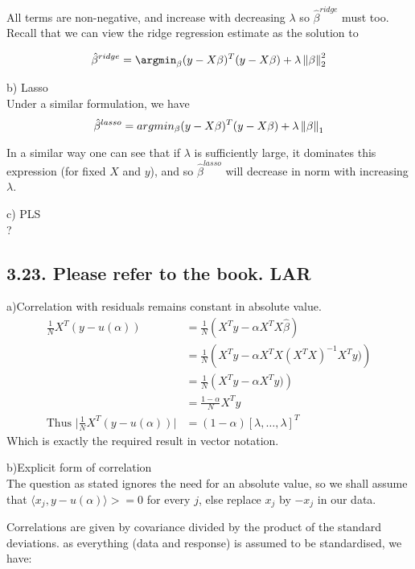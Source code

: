 All terms are non-negative, and increase with decreasing $\lambda$ so $\hat{\beta}^{ridge}$ must too.
Recall that we can view the ridge regression estimate as the solution to

$$\hat{\beta}^{ridge} = \argmin_\beta (y - X\beta)^T (y - X \beta) + \lambda \norm{\beta}_2^2$$

b) Lasso\\

Under a similar formulation, we have 
$$\hat{\beta}^{lasso} = argmin_\beta (y - X\beta)^T (y - X \beta) + \lambda \left\lVert\beta\right\rVert_1$$

In a similar way one can see that if $\lambda$ is sufficiently large, it dominates this expression (for fixed $X$ and $y$), and so $\hat{\beta}^{lasso}$ will decrease in norm with increasing $\lambda$.

c) PLS\\

?

\subsection*{3.23. Please refer to the book. LAR}
a)Correlation with residuals remains constant in absolute value.\\

\begin{align*}
    \frac{1}{N} X^T \left(y - u(\alpha)\right) &= \frac{1}{N}\left(X^T y - \alpha X^T X\hat{\beta}\right)\\
    &= \frac{1}{N}\left(X^T y - \alpha X^T X \left(X^T X\right)^{-1} X^T y)\right)\\
    &= \frac{1}{N}\left(X^T y - \alpha X^T y)\right)\\
    &= \frac{1-\alpha}{N}X^T y\\
    \text{Thus }\lvert\frac{1}{N} X^T \left(y - u(\alpha)\right) \rvert &= (1-\alpha) [\lambda,\dots,\lambda]^T
\end{align*}
Which is exactly the required result in vector notation.

b)Explicit form of correlation\\

The question as stated ignores the need for an absolute value, so we shall assume that $\langle x_j, y - u(\alpha)\rangle >= 0$ for every $j$, else replace $x_j$ by $-x_j$ in our data.

Correlations are given by covariance divided by the product of the standard deviations. as everything (data and response) is assumed to be standardised, we have:

